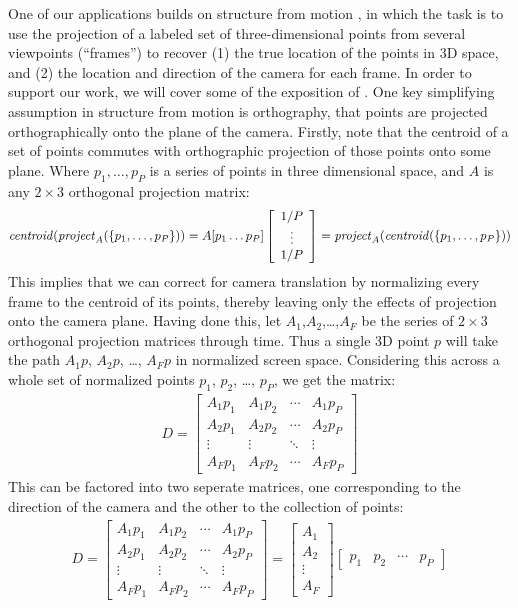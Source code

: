 One of our applications builds on structure from motion \cite{sfm}, in which the task is to use the projection of a labeled set of three-dimensional points from several viewpoints (``frames'') to recover (1) the true location of the points in 3D space, and (2) the location and direction of the camera for each frame.  In order to support our work, we will cover some of the exposition of \cite{sfm}. One key simplifying assumption in structure from motion is orthography, that points are projected orthographically onto the plane of the camera.  Firstly, note that the centroid of a set of points commutes with orthographic projection of those points onto some plane.  Where $p_1, \ldots, p_P$ is a series of points in three dimensional space, and $A$ is any $2\times 3$ orthogonal projection matrix:
\begin{align}
{\it centroid}({\it project}_A (\{p_1, \ldots, p_P\})) = A[p_1 \ldots p_P]\left[\begin{array}{c}1/P \\ \vdots \\ 1/P\end{array}\right] ={\it project}_A({\it centroid} (\{p_1, \ldots, p_P\}))
\end{align}
This implies that we can correct for camera translation by normalizing every frame to the centroid of its points, thereby leaving only the effects of projection onto the camera plane.  Having done this, let $A_1$,$A_2$,\ldots,$A_F$ be the series of $2\times 3$ orthogonal projection matrices through time.  Thus a single 3D point $p$ will take the path $A_1p$, $A_2p$, \ldots, $A_Fp$ in normalized screen space.  Considering this across a whole set of normalized points $p_1$, $p_2$, \ldots, $p_P$, we get the matrix:
\begin{align}D = 
\left[ \begin{array}{cccc} 
A_1p_1 & A_1p_2 & \cdots & A_1p_P \\
A_2p_1 & A_2p_2 & \cdots & A_2p_P \\
\vdots & \vdots & \ddots & \vdots \\
A_Fp_1 & A_Fp_2 & \cdots & A_Fp_P
 \end{array} \right ]
\end{align}
This can be factored into two seperate matrices, one corresponding to the direction of the camera and the other to the collection of points:
\begin{align}\label{decomp}
D=
\left[ \begin{array}{cccc} 
A_1p_1 & A_1p_2 & \cdots & A_1p_P \\
A_2p_1 & A_2p_2 & \cdots & A_2p_P \\
\vdots & \vdots & \ddots & \vdots \\
A_Fp_1 & A_Fp_2 & \cdots & A_Fp_P
 \end{array} \right ] = 
\left[ \begin{array}{c} A_1 \\ A_2 \\ \vdots \\ A_F \end{array} \right ] \left[ \begin{array}{cccc} p_1 & p_2 & \cdots & p_P \end{array} \right ]
\end{align}
